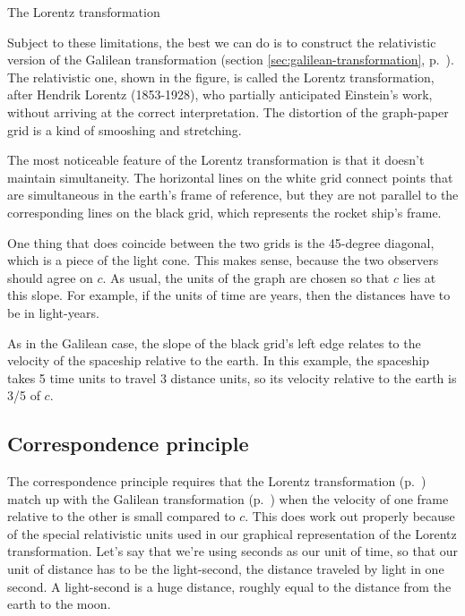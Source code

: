 \begin{section}{The Lorentz transformation}

Subject to these limitations, the best we can do is to construct the relativistic
version of the Galilean transformation (section \ref{sec:galilean-transformation},
p.~\pageref{sec:galilean-transformation}). The relativistic one, shown in the figure, is called
the Lorentz transformation, after Hendrik Lorentz (1853-1928),
who partially anticipated Einstein's work, without arriving at the correct interpretation.
The distortion of the graph-paper grid is a kind of smooshing and stretching.




The most noticeable feature of the Lorentz transformation is that it doesn't
maintain simultaneity. The horizontal lines on the white grid connect points
that are simultaneous in the earth's frame of reference, but they are not
parallel to the corresponding lines on the black grid, which represents the
rocket ship's frame.

One thing that does coincide between the two grids is the 45-degree diagonal,
which is a piece of the light cone. This makes sense, because the two observers
should agree on $c$. As usual, the units of the graph are chosen so that $c$ lies
at this slope. For example, if the units of time are years, then the distances have
to be in light-years.

As in the Galilean case, the slope of the black grid's left edge relates to the velocity of
the spaceship relative to the earth. In this example, the spaceship takes 5 time units to
travel 3 distance units, so its velocity relative to the earth is 3/5 of $c$.

\section{Correspondence principle}

The correspondence principle requires that the Lorentz transformation (p.~\pageref{fig:lorentz-transformation})
match up with the Galilean transformation (p.~\pageref{sec:galilean-transformation}) when the
velocity of one frame relative to the other is small compared to $c$.
This does work out properly because of the special relativistic units used in our graphical representation of the
Lorentz transformation. Let's say that we're using seconds as our unit of time, so that our unit of
distance has to be the light-second, the distance traveled by light in one second. A light-second
is a huge distance, roughly equal to the distance from the earth to the moon.


\end{section}

